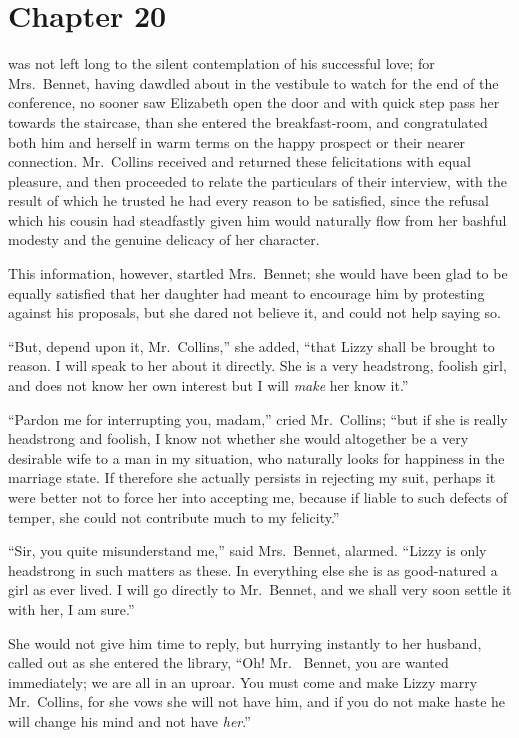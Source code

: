 \chapter{Chapter 20}


 was not left long to the silent contemplation of his
successful love; for Mrs.\ Bennet, having dawdled about in the
vestibule to watch for the end of the conference, no sooner saw
Elizabeth open the door and with quick step pass her towards
the staircase, than she entered the breakfast-room, and
congratulated both him and herself in warm terms on the happy
prospect or their nearer connection.  Mr.\ Collins received and
returned these felicitations with equal pleasure, and then
proceeded to relate the particulars of their interview, with the
result of which he trusted he had every reason to be satisfied,
since the refusal which his cousin had steadfastly given him
would naturally flow from her bashful modesty and the genuine
delicacy of her character.

This information, however, startled Mrs.\ Bennet; she would
have been glad to be equally satisfied that her daughter had
meant to encourage him by protesting against his proposals,
but she dared not believe it, and could not help saying so.

``But, depend upon it, Mr.\ Collins,'' she added, ``that Lizzy shall
be brought to reason.  I will speak to her about it directly.
She is a very headstrong, foolish girl, and does not know her
own interest but I will \emph{make} her know it.''

``Pardon me for interrupting you, madam,'' cried Mr.\ Collins;
``but if she is really headstrong and foolish, I know not whether
she would altogether be a very desirable wife to a man in my
situation, who naturally looks for happiness in the marriage
state.  If therefore she actually persists in rejecting my suit,
perhaps it were better not to force her into accepting me,
because if liable to such defects of temper, she could not
contribute much to my felicity.''

``Sir, you quite misunderstand me,'' said Mrs.\ Bennet, alarmed.
``Lizzy is only headstrong in such matters as these.  In everything
else she is as good-natured a girl as ever lived.  I will go
directly to Mr.\ Bennet, and we shall very soon settle it with her,
I am sure.''

She would not give him time to reply, but hurrying instantly to
her husband, called out as she entered the library, ``Oh! Mr.\ %
Bennet, you are wanted immediately; we are all in an uproar.
You must come and make Lizzy marry Mr.\ Collins, for she vows
she will not have him, and if you do not make haste he will
change his mind and not have \emph{her}.''

